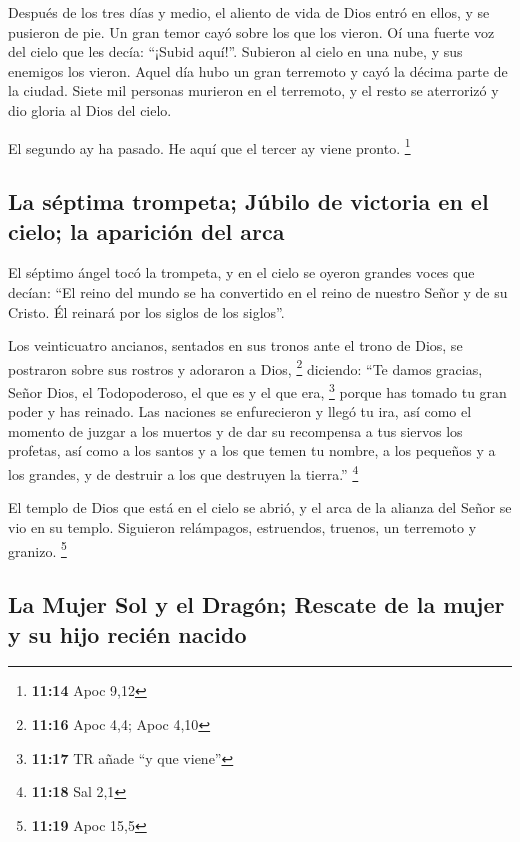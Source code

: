  Después de los tres días y medio, el aliento de vida de
Dios entró en ellos, y se pusieron de pie. Un gran temor cayó sobre los
que los vieron.  Oí una fuerte voz del cielo que les
decía: ``¡Subid aquí!''. Subieron al cielo en una nube, y sus enemigos
los vieron.  Aquel día hubo un gran terremoto y cayó la
décima parte de la ciudad. Siete mil personas murieron en el terremoto,
y el resto se aterrorizó y dio gloria al Dios del cielo.

 El segundo ay ha pasado. He aquí que el tercer ay viene
pronto. \footnote{\textbf{11:14} Apoc 9,12}

\hypertarget{la-suxe9ptima-trompeta-juxfabilo-de-victoria-en-el-cielo-la-apariciuxf3n-del-arca}{%
\subsection{La séptima trompeta; Júbilo de victoria en el cielo; la
aparición del
arca}\label{la-suxe9ptima-trompeta-juxfabilo-de-victoria-en-el-cielo-la-apariciuxf3n-del-arca}}

 El séptimo ángel tocó la trompeta, y en el cielo se
oyeron grandes voces que decían: ``El reino del mundo se ha convertido
en el reino de nuestro Señor y de su Cristo. Él reinará por los siglos
de los siglos''.

 Los veinticuatro ancianos, sentados en sus tronos ante
el trono de Dios, se postraron sobre sus rostros y adoraron a Dios,
\footnote{\textbf{11:16} Apoc 4,4; Apoc 4,10}  diciendo:
``Te damos gracias, Señor Dios, el Todopoderoso, el que es y el que era,
\footnote{\textbf{11:17} TR añade ``y que viene''} porque has tomado tu
gran poder y has reinado.  Las naciones se enfurecieron y
llegó tu ira, así como el momento de juzgar a los muertos y de dar su
recompensa a tus siervos los profetas, así como a los santos y a los que
temen tu nombre, a los pequeños y a los grandes, y de destruir a los que
destruyen la tierra.'' \footnote{\textbf{11:18} Sal 2,1}

 El templo de Dios que está en el cielo se abrió, y el
arca de la alianza del Señor se vio en su templo. Siguieron relámpagos,
estruendos, truenos, un terremoto y granizo. \footnote{\textbf{11:19}
  Apoc 15,5}

\hypertarget{la-mujer-sol-y-el-draguxf3n-rescate-de-la-mujer-y-su-hijo-reciuxe9n-nacido}{%
\subsection{La Mujer Sol y el Dragón; Rescate de la mujer y su hijo
recién
nacido}\label{la-mujer-sol-y-el-draguxf3n-rescate-de-la-mujer-y-su-hijo-reciuxe9n-nacido}}

